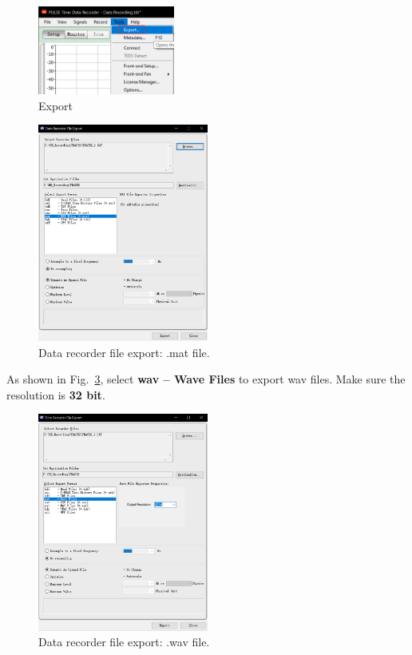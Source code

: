 \documentclass{article}
\begin{document}
\begin{figure}[!htb]
    \centering
    \includegraphics[width = 0.4\textwidth]{fig/Export_20230301100801.png}
    \caption{Export}
    \label{fig:fisodsexpoierj2:3902jr}
\end{figure}
\begin{figure}[!htb]
    \centering
    \includegraphics[width = 0.5\textwidth]{fig/DataRecorderFileExport_mat_20230301125537.png}
    \caption{Data recorder file export: .mat file.}
    \label{fig:fds:f0239jr0239:0wfdijf}
\end{figure}

As shown in Fig.~\ref{fig:fd:0392j:02w3ei2093}, select \textbf{wav -- Wave Files} to export wav files.
Make sure the resolution is \textbf{32 bit}.
\begin{figure}[!htb]
    \centering
    \includegraphics[width = 0.5\textwidth]{fig/DataRecorderFileExport_wav_20230301125558.png}
    \caption{Data recorder file export: .wav file.}
    \label{fig:fd:0392j:02w3ei2093}
\end{figure}
\end{document}
